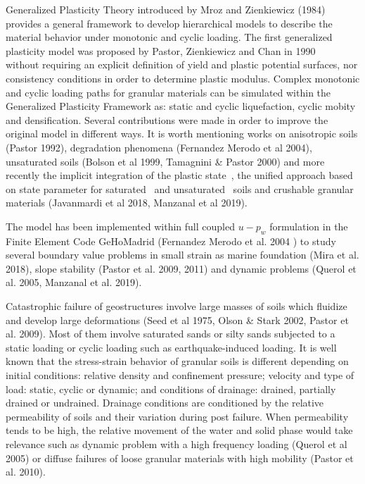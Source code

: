 \documentclass[preprint,12pt,a4paper]{elsarticle}
\begin{document}
Generalized Plasticity Theory introduced by Mroz and Zienkiewicz (1984) provides a general framework to develop hierarchical models to describe the material behavior under monotonic and cyclic loading. The first generalized plasticity model was proposed by Pastor, Zienkiewicz and Chan in 1990 ~\cite{PastorZC:90} without requiring an explicit definition of yield and plastic potential surfaces, nor consistency conditions in order to determine plastic modulus. Complex monotonic and cyclic loading paths for granular materials can be simulated within the Generalized Plasticity Framework as: static and cyclic liquefaction, cyclic mobity and densification. Several contributions were made in order to improve the original model in different ways. It is worth mentioning works on anisotropic soils (Pastor 1992), degradation phenomena (Fernandez Merodo et al 2004), unsaturated soils (Bolson et al 1999, Tamagnini & Pastor 2000) and more recently the implicit integration of the plastic state~\cite{Mira2009}, the unified approach based on state parameter for saturated~\cite{Manzanal2011} and unsaturated~\cite{Manzanal2011a} soils and crushable granular materials (Javanmardi et al 2018, Manzanal et al 2019).

The model has been implemented within  full coupled  $u-p_w$ formulation in the Finite Element Code GeHoMadrid (Fernandez Merodo et al. 2004 ) to study several boundary value problems in small strain as marine foundation (Mira et al. 2018), slope stability (Pastor et al. 2009, 2011) and dynamic problems  (Querol et al. 2005, Manzanal et al. 2019). 

Catastrophic failure of geostructures involve large masses of soils which fluidize and develop large deformations (Seed et al 1975, Olson & Stark 2002, Pastor et al. 2009). Most of them involve saturated sands or silty sands subjected to a static loading or cyclic loading such as earthquake-induced loading. It is well known that the stress-strain behavior of granular soils is different depending on initial conditions: relative density and confinement pressure; velocity and type of load: static, cyclic or dynamic; and conditions of drainage: drained, partially drained or undrained. Drainage conditions are conditioned by the relative permeability of soils and their variation during post failure. When permeability tends to be high, the relative movement of the water and solid phase would take relevance such as dynamic problem with a high frequency loading (Querol et al 2005) or diffuse failures of loose granular materials with high mobility (Pastor et al. 2010). 
\end{document}
